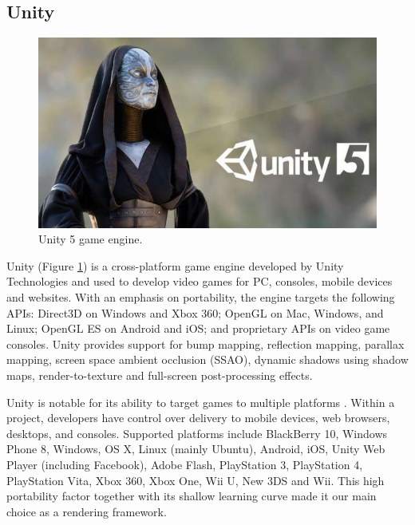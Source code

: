 \documentclass[a4paper, 12pt]{amsart}
\begin{document}
\subsection{Unity}

\begin{figure}[htb]
\centering
\includegraphics[width=.9\linewidth]{fig_unity_logo}
\caption{Unity 5 game engine.}
\label{fig:unity_logo}
\end{figure}

Unity (Figure \ref{fig:unity_logo}) is a cross-platform game engine developed by Unity Technologies and used to develop video games for PC, consoles, mobile devices and websites. With an emphasis on portability, the engine targets the following APIs: Direct3D on Windows and Xbox 360; OpenGL on Mac, Windows, and Linux; OpenGL ES on Android and iOS; and proprietary APIs on video game consoles. Unity provides support for bump mapping, reflection mapping, parallax mapping, screen space ambient occlusion (SSAO), dynamic shadows using shadow maps, render-to-texture and full-screen post-processing effects.

Unity is notable for its ability to target games to multiple platforms \cite{bib_unity}. Within a project, developers have control over delivery to mobile devices, web browsers, desktops, and consoles. Supported platforms include BlackBerry 10, Windows Phone 8, Windows, OS X, Linux (mainly Ubuntu), Android, iOS, Unity Web Player (including Facebook), Adobe Flash, PlayStation 3, PlayStation 4, PlayStation Vita, Xbox 360, Xbox One, Wii U, New 3DS and Wii. This high portability factor together with its shallow learning curve made it our main choice as a rendering framework.
\end{document}
